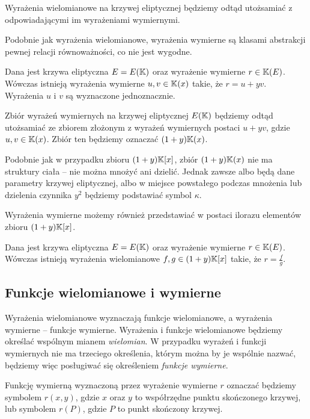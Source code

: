 \begin{remark}
Wyrażenia wielomianowe na krzywej eliptycznej
będziemy odtąd utożsamiać z odpowiadającymi im wyrażeniami wymiernymi.
\end{remark}

Podobnie jak wyrażenia wielomianowe,
wyrażenia wymierne są klasami abstrakcji pewnej relacji równoważności,
co nie jest wygodne.

\begin{theorem}
Dana jest krzywa eliptyczna $E = E(\mathbb{K})$
oraz wyrażenie wymierne $r \in \mathbb{K}(E)$.
Wówczas istnieją wyrażenia wymierne $u, v \in \mathbb{K}(x)$ takie,
że $r = u + yv$.
Wyrażenia $u$ i $v$ są wyznaczone jednoznacznie.
\end{theorem}

\begin{remark}
Zbiór wyrażeń wymiernych na krzywej eliptycznej $E(\mathbb{K})$
będziemy odtąd utożsamiać ze zbiorem
złożonym z wyrażeń wymiernych postaci $u + yv$,
gdzie $u,v \in \mathbb{K}(x)$.
Zbiór ten będziemy oznaczać $(1 + y)\mathbb{K}(x)$.
\end{remark}

Podobnie jak w przypadku zbioru $(1 + y)\mathbb{K}[x]$,
zbiór $(1 + y)\mathbb{K}(x)$ nie ma struktury ciała --
nie można mnożyć ani dzielić.
Jednak zawsze albo będą dane parametry krzywej eliptycznej,
albo w miejsce powstałego podczas mnożenia lub dzielenia czynnika $y^2$
będziemy podstawiać symbol $\kappa$.

Wyrażenia wymierne możemy również przedstawiać w postaci ilorazu
elementów zbioru $(1 + y)\mathbb{K}[x]$.

\begin{theorem}
Dana jest krzywa eliptyczna $E = E(\mathbb{K})$
oraz wyrażenie wymierne $r \in \mathbb{K}(E)$.
Wówczas istnieją wyrażenia wielomianowe $f, g \in (1 + y)\mathbb{K}[x]$ takie,
że $r = \frac{f}{g}$.
\end{theorem}

\subsection*{Funkcje wielomianowe i wymierne}

Wyrażenia wielomianowe wyznaczają funkcje wielomianowe,
a wyrażenia wymierne -- funkcje wymierne.
Wyrażenia i funkcje wielomianowe będziemy określać
wspólnym mianem \emph{wielomian}.
W przypadku wyrażeń i funkcji wymiernych nie ma trzeciego określenia,
którym można by je wspólnie nazwać,
będziemy więc posługiwać się określeniem \emph{funkcje wymierne}.

\begin{remark}
Funkcję wymierną wyznaczoną przez wyrażenie wymierne $r$
oznaczać będziemy symbolem $r(x, y)$,
gdzie $x$ oraz $y$ to współrzędne punktu skończonego krzywej,
lub symbolem $r(P)$, gdzie $P$ to punkt skończony krzywej.
\end{remark}

